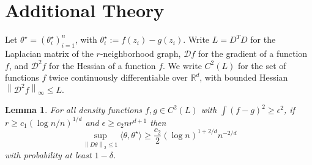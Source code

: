 \documentclass{article}
\newcommand{\Reals}{\mathbb{R}}
\newcommand{\norm}[1]{\left\lVert#1\right\rVert}
\newcommand{\dotp}[2]{\langle #1, #2 \rangle}
\newcommand{\1}{\mathbb{I}}
\newcommand{\Rd}{\Reals^d}
\newcommand{\thetast}{\theta^{\star}}
\newcommand{\gradient}{\mathcal{D}}
\newcommand{\Hessian}{\mathcal{D}^2}
\theoremstyle{alden}
\theoremstyle{aldenthm}
\newtheorem{lemma}{Lemma}
\theoremstyle{definition}
\theoremstyle{remark}
\begin{document}
\section{Additional Theory}
Let $\theta^{\star} = (\thetast_i)_{i = 1}^n$, with $\thetast_i := f(z_i) - g(z_i)$. Write $L = D^T D$ for the Laplacian matrix of the $r$-neighborhood graph, $\gradient f$ for the gradient of a function $f$, and $\Hessian f$ for the Hessian of a function $f$. We write $C^{2}(L)$ for the set of functions $f$ twice continuously differentiable over $\Rd$, with bounded Hessian $\norm{\Hessian f}_{\infty} \leq L$.
\begin{lemma}
	\label{lem: approx_error}
	For all density functions $f,g \in C^2(L)$ with $\int (f - g)^2 \geq \epsilon^2$, if $r \geq c_1 (\log n / n)^{1/d}$ and $\epsilon \geq c_2 n r^{d + 1} $ then
	\begin{equation*}
	\sup_{\norm{D\theta}_2 \leq 1} \dotp{\theta}{\thetast} \geq \frac{c_2}{2} (\log n)^{1 + 2/d} n^{-2/d}
	\end{equation*}
	with probability at least $1 - \delta$.
\end{lemma}
\end{document}
